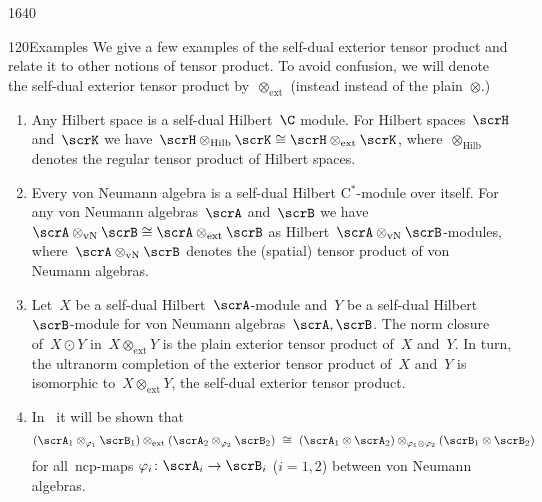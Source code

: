 \begin{parsec}{1640}
\begin{point}{120}{Examples}%
We give a few examples of the self-dual exterior tensor product
    and relate it to other notions of tensor product.
To avoid confusion, we will denote the self-dual exterior
    tensor product by~$\otimes_{\text{ext}}$
    (instead instead of the plain~$\otimes$.)
\begin{enumerate}
\item
Any Hilbert space is a self-dual Hilbert~$\C$ module.
For Hilbert spaces~$\scrH$ and~$\scrK$
    we have~$\scrH \otimes_{\text{Hilb}} \scrK
        \cong \scrH \otimes_{\text{ext}} \scrK$,
    where~$\otimes_{\text{Hilb}}$ denotes the regular tensor product of
    Hilbert spaces.
\item
Every von Neumann algebra is a self-dual Hilbert C$^*$-module
    over itself.
For any von Neumann algebras~$\scrA$ and~$\scrB$
    we have~$\scrA\otimes_{\text{vN}} \scrB
        \cong \scrA \otimes_{\text{ext}} \scrB$
        as Hilbert~$\scrA\otimes_{\text{vN}} \scrB$-modules,
        where~$\scrA\otimes_{\text{vN}}\scrB$ denotes the (spatial)
        tensor product of von Neumann algebras.
\item
Let~$X$ be a self-dual Hilbert~$\scrA$-module
    and~$Y$ be a self-dual Hilbert~$\scrB$-module
        for von Neumann algebras~$\scrA,\scrB$.
The norm closure of~$X\odot Y$
    in~$X \otimes_{\text{ext}} Y$
        is the plain exterior tensor product of~$X$ and~$Y$.
In turn, the ultranorm completion of the exterior tensor product
    of~$X$ and~$Y$ is isomorphic to~$X \otimes_{\text{ext}} Y$,
        the self-dual exterior tensor product.
\item
In~ it will be shown that
\begin{equation*}
(\scrA_1 \otimes_{\varphi_1} \scrB_1)
    \otimes_{\text{ext}} (\scrA_2 \otimes_{\varphi_2} \scrB_2)
\ \cong \ 
(\scrA_1 \otimes \scrA_2) \otimes_{\varphi_1\otimes \varphi_2} (\scrB_1 \otimes \scrB_2)
\end{equation*}
        for all~ncp-maps $\varphi_i\colon \scrA_i \to \scrB_i$ ($i=1,2$)
    between von Neumann algebras.
\end{enumerate}
\spacingfix{}
\end{point}
\end{parsec}
